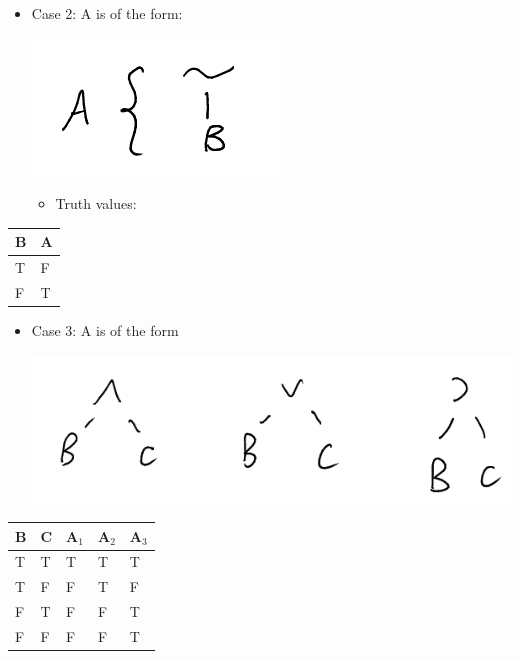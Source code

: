 \documentclass[11pt]{article}
\begin{document}
\begin{enumerate}
\begin{itemize}
\item Case 2: A is of the form: \begin{center}
\includegraphics[width=.9\linewidth]{./Images/i11.png}
\end{center}
\begin{itemize}
\item Truth values:
\end{itemize}
\end{itemize}
\begin{center}
\begin{tabular}{ll}
B & A\\
\hline
T & F\\
F & T\\
\end{tabular}
\end{center}
\begin{itemize}
\item Case 3: A is of the form \begin{center}
\includegraphics[width=.9\linewidth]{./Images/i12.png}
\end{center}
\end{itemize}

\begin{center}
\begin{tabular}{lllll}
B & C & A\(_{\text{1}}\) & A\(_{\text{2}}\) & A\(_{\text{3}}\)\\
\hline
T & T & T & T & T\\
T & F & F & T & F\\
F & T & F & F & T\\
F & F & F & F & T\\
\end{tabular}
\end{center}
\end{enumerate}
\end{document}
